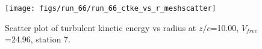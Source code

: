 \begin{figure}[H]
\centering
\texttt{[image: figs/run\_66/run\_66\_ctke\_vs\_r\_meshscatter]}
\caption{Scatter plot of turbulent kinetic energy vs radius at $z/c$=10.00, $V_{free}$=24.96, station 7.}
\end{figure}


